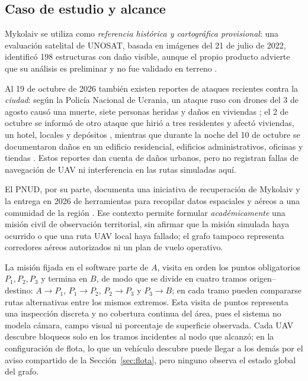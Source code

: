 \documentclass[journal,10pt]{IEEEtran}
\begin{document}
\subsection{Caso de estudio y alcance}

Mykolaiv se utiliza como \emph{referencia histórica y cartográfica
provisional}: una evaluación satelital de UNOSAT, basada en imágenes del
21 de julio de 2022, identificó 198 estructuras con daño visible, aunque
el propio producto advierte que su análisis es preliminar y no fue
validado en terreno \cite{unosat}.

Al 19 de octubre de 2026 también existen reportes de ataques recientes
contra la \emph{ciudad}: según la Policía Nacional de Ucrania, un ataque
ruso con drones del 3 de agosto causó una muerte, siete personas heridas y
daños en viviendas \cite{policiaAgo2026}; el 2 de octubre se informó de
otro ataque que hirió a tres residentes y afectó viviendas, un hotel,
locales y depósitos \cite{policiaOctDos2026}, mientras que durante la
noche del 10 de octubre se documentaron daños en un edificio residencial,
edificios administrativos, oficinas y tiendas \cite{policiaOctDiez2026}.
Estos reportes dan cuenta de daños urbanos, pero no registran fallas de
navegación de UAV ni interferencia en las rutas simuladas aquí.

El PNUD, por su parte, documenta una iniciativa de recuperación de Mykolaiv
y la entrega en 2026 de herramientas para recopilar datos espaciales y
aéreos a una comunidad de la región \cite{undpM,undpDatos}. Ese contexto
permite formular \emph{académicamente} una misión civil de observación
territorial, sin afirmar que la misión simulada haya ocurrido o que una
ruta UAV local haya fallado; el grafo tampoco representa corredores aéreos
autorizados ni un plan de vuelo operativo.

La misión fijada en el software parte de $A$, visita en orden los puntos
obligatorios $P_1,P_2,P_3$ y termina en $B$, de modo que se divide en cuatro
tramos origen--destino: $A\!\to\!P_1$, $P_1\!\to\!P_2$,
$P_2\!\to\!P_3$ y $P_3\!\to\!B$; en cada tramo pueden compararse rutas
alternativas entre los mismos extremos. Esta visita de puntos representa
una inspección discreta y no cobertura continua del área, pues el sistema
no modela cámara, campo visual ni porcentaje de superficie observada. Cada
UAV descubre bloqueos solo en los tramos incidentes al nodo que alcanzó; en
la configuración de flota, lo que un vehículo descubre puede llegar a los
demás por el aviso compartido de la Sección~\ref{sec:flota}, pero ninguno
observa el estado global del grafo.
\end{document}
